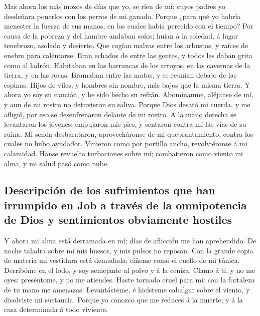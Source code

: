  Mas ahora los más mozos de días que yo, se ríen de mí;
cuyos padres yo desdeñara ponerlos con los perros de mi ganado.
 Porque ¿para qué yo habría menester la fuerza de sus
manos, en los cuales había perecido con el tiempo?  Por
causa de la pobreza y del hambre andaban solos; huían á la soledad, á
lugar tenebroso, asolado y desierto.  Que cogían malvas
entre los arbustos, y raíces de enebro para calentarse. 
Eran echados de entre las gentes, y todos les daban grita como al
ladrón.  Habitaban en las barrancas de los arroyos, en las
cavernas de la tierra, y en las rocas.  Bramaban entre las
matas, y se reunían debajo de las espinas.  Hijos de
viles, y hombres sin nombre, más bajos que la misma tierra.
 Y ahora yo soy su canción, y he sido hecho su refrán.
 Abomínanme, aléjanse de mí, y aun de mi rostro no
detuvieron su saliva.  Porque Dios desató mi cuerda, y me
afligió, por eso se desenfrenaron delante de mi rostro. 
A la mano derecha se levantaron los jóvenes; empujaron mis pies, y
sentaron contra mí las vías de su ruina.  Mi senda
desbarataron, aprovecháronse de mi quebrantamiento, contra los cuales no
hubo ayudador.  Vinieron como por portillo ancho,
revolviéronse á mi calamidad.  Hanse revuelto turbaciones
sobre mí; combatieron como viento mi alma, y mi salud pasó como nube.

\hypertarget{descripciuxf3n-de-los-sufrimientos-que-han-irrumpido-en-job-a-travuxe9s-de-la-omnipotencia-de-dios-y-sentimientos-obviamente-hostiles}{%
\subsection{Descripción de los sufrimientos que han irrumpido en Job a
través de la omnipotencia de Dios y sentimientos obviamente
hostiles}\label{descripciuxf3n-de-los-sufrimientos-que-han-irrumpido-en-job-a-travuxe9s-de-la-omnipotencia-de-dios-y-sentimientos-obviamente-hostiles}}

 Y ahora mi alma está derramada en mí; días de aflicción
me han aprehendido.  De noche taladra sobre mí mis
huesos, y mis pulsos no reposan.  Con la grande copia de
materia mi vestidura está demudada; cíñeme como el cuello de mi túnica.
 Derribóme en el lodo, y soy semejante al polvo y á la
ceniza.  Clamo á ti, y no me oyes; preséntome, y no me
atiendes.  Haste tornado cruel para mí: con la fortaleza
de tu mano me amenazas.  Levantásteme, é hicísteme
cabalgar sobre el viento, y disolviste mi sustancia. 
Porque yo conozco que me reduces á la muerte; y á la casa determinada á
todo viviente.

